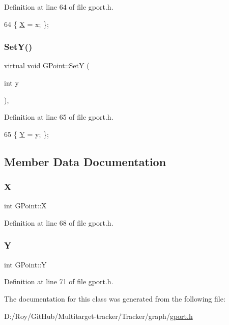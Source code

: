 Definition at line 64 of file gport.\+h.


\begin{DoxyCode}
64 \{ \mbox{\hyperlink{class_g_point_a0a26572e08c37a5e7e6854ae8c7fee66}{X}} = x; \};
\end{DoxyCode}
\mbox{\label{class_g_point_a20d2d7826baf36fe4b8f73b88d75cf7d}} 
\subsubsection{\texorpdfstring{Set\+Y()}{SetY()}}
{\footnotesize\ttfamily virtual void G\+Point\+::\+SetY (\begin{DoxyParamCaption}\item[{int}]{y }\end{DoxyParamCaption})\hspace{0.3cm}{\ttfamily [inline]}, {\ttfamily [virtual]}}



Definition at line 65 of file gport.\+h.


\begin{DoxyCode}
65 \{ \mbox{\hyperlink{class_g_point_aca224bb9b30fab3b59cd25a9261c1069}{Y}} = y; \};
\end{DoxyCode}


\subsection{Member Data Documentation}
\mbox{\label{class_g_point_a0a26572e08c37a5e7e6854ae8c7fee66}} 
\subsubsection{\texorpdfstring{X}{X}}
{\footnotesize\ttfamily int G\+Point\+::X\hspace{0.3cm}{\ttfamily [protected]}}



Definition at line 68 of file gport.\+h.

\mbox{\label{class_g_point_aca224bb9b30fab3b59cd25a9261c1069}} 
\subsubsection{\texorpdfstring{Y}{Y}}
{\footnotesize\ttfamily int G\+Point\+::Y\hspace{0.3cm}{\ttfamily [protected]}}



Definition at line 71 of file gport.\+h.



The documentation for this class was generated from the following file\+:\begin{DoxyCompactItemize}
\item 
D\+:/\+Roy/\+Git\+Hub/\+Multitarget-\/tracker/\+Tracker/graph/\mbox{\hyperlink{gport_8h}{gport.\+h}}\end{DoxyCompactItemize}
